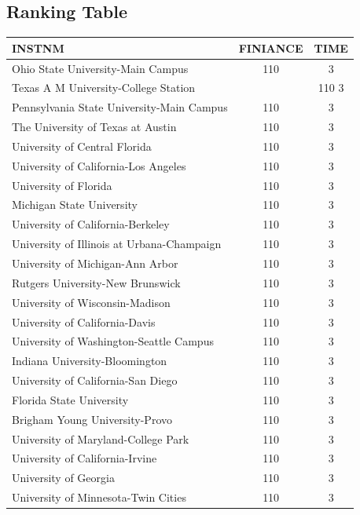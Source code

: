 \documentclass{mcmthesis}
\begin{document}
\begin{appendices}
    
    \section{Ranking Table}
    
    
    \begin{tabular}{lcc}\hline
        INSTNM	 &FINIANCE	&TIME\\\hline
        Ohio State University-Main Campus	&110	&3\\
        Texas A M University-College Station	&&110	3\\
        Pennsylvania State University-Main Campus	&110&	3\\
        The University of Texas at Austin	&110&	3\\
        University of Central Florida	&110	&3\\
        University of California-Los Angeles	&110	&3\\
        University of Florida	&110&	3\\
        Michigan State University	&110	&3\\
        University of California-Berkeley	&110&	3\\
        University of Illinois at Urbana-Champaign&	110&	3\\
        University of Michigan-Ann Arbor	&110	&3\\
        Rutgers University-New Brunswick	&110	&3\\
        University of Wisconsin-Madison&	110&	3\\
        University of California-Davis	&110	&3\\
        University of Washington-Seattle Campus&	110&	3\\
        Indiana University-Bloomington	&110	&3\\
        University of California-San Diego	&110	&3\\
        Florida State University	&110	&3\\
        Brigham Young University-Provo	&110	&3\\
        University of Maryland-College Park	&110	&3\\
        University of California-Irvine	&110	&3\\
        University of Georgia	&110	&3\\
        University of Minnesota-Twin Cities	&110&	3\\

\end{tabular}
\end{appendices}
\end{document}
